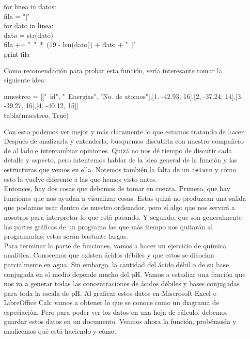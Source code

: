 \documentclass[10pt,letterpaper]{article}
\newcommand{\inlinecode}[1]{
\colorbox{light-gray}{\texttt{#1}}
}
\newenvironment{Code}
{
\begin{lrbox}{\selvestebox}%
\begin{minipage}{\dimexpr\columnwidth-2\fboxsep\relax}
\fontfamily{\ttdefault}\selectfont
}
{\end{minipage}\end{lrbox}%
\begin{center}
\colorbox{light-gray}{\usebox{\selvestebox}}
\end{center}
}
\begin{document}
\begin{small}
\begin{Code}
\hspace*{4mm} for linea in datos:\\
\hspace*{11mm} fila = "|"\\
\hspace*{11mm} for dato in linea:\\
\hspace*{18mm} dato = str(dato)\\
\hspace*{18mm} fila += "\ "\ *\ (19 - len(dato)) + dato + "\ |"\\
\hspace*{11mm} print fila
\end{Code}
\end{small}

Como recomendaci\'on para probar esta funci\'on, ser\'ia interesante tomar la siguiente idea:

\begin{Code}
muestreo = [["\ \hspace*{-2mm}id", "\ \hspace*{-2mm}Energias", "No. de atomos"],[1, -42.93, 16],[2, -37.24, 14],[3, -39.27, 16],[4, -40.12, 15]]\\
tabla(muestreo, True)
\end{Code}

Con esto podemos ver mejor y m\'as claramente lo que estamos tratando de hacer. Despu\'es de analizarla y entenderla, busquemos discutirla con nuestro compa\~nero de al lado e intercambiar opiniones. Quiz\'a no nos d\'e tiempo de discutir cada detalle y aspecto, pero intentemos hablar de la idea general de la funci\'on y las estructuras que vemos en ella. Notemos tambi\'en la falta de un \inlinecode{return} y c\'omo esto la vuelve diferente a las que hemos visto antes.\\

Entonces, hay dos cosas que debemos de tomar en cuenta. Primero, que hay funciones que nos ayudan a visualizar cosas. Estas quiz\'a no produzcan una salida que podamos usar dentro de nuestro ordenador, pero s\'i algo que nos servir\'a a nosotros para interpretar lo que est\'a pasando. Y segundo, que son generalmente las partes gr\'aficas de un programa las que m\'as tiempo nos quitar\'an al programarlas; estas ser\'an bastante largas.\\

Para terminar la parte de funciones, vamos a hacer un ejercicio de qu\'imica anal\'itica. Conocemos que existen \'acidos d\'ebiles y que estos se disocian parcialmente en agua. Sin embargo, la cantidad del \'acido d\'ebil o de su base conjugada en el medio depende mucho del pH. Vamos a estudiar una funci\'on que nos va a generar todas las concentraciones de \'acidos d\'ebiles y bases conjugadas para toda la escala de pH. Al graficar estos datos en Miscrosoft Excel o LibreOffice Calc vamos a obtener lo que se conoce como un diagrama de especiaci\'on. Pero para poder ver los datos en una hoja de c\'alculo, debemos guardar estos datos en un documento. Veamos ahora la funci\'on, prob\'emosla y analicemos qu\'e est\'a haciendo y c\'omo.
\end{document}

